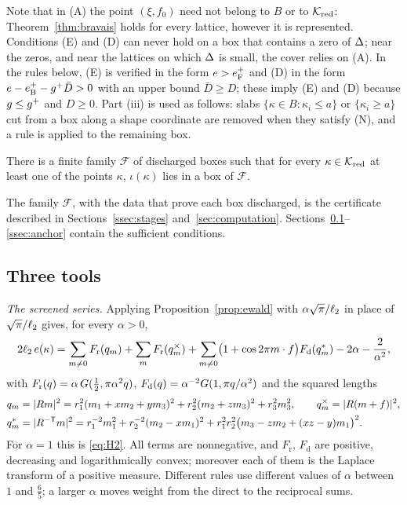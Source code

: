 Note that in (A) the point $(\xi,f_0)$ need not belong to $B$ or to $\mathcal K_{\mathrm{red}}$: Theorem~\ref{thm:bravais} holds for every
lattice, however it is represented. Conditions (E) and (D) can never hold on a box that contains a zero of $\Delta$; near the zeros,
and near the lattices on which $\Delta$ is small, the cover relies on (A). In the rules below, (E) is verified in the form
$e>e_{\mathrm F}^+$ and (D) in the form $e-e_{\mathrm B}^+-g^+\bar D>0$ with an upper bound $\bar D\ge D$; these imply (E) and (D) because
$g\le g^+$ and $D\ge0$. Part (iii) is used as follows: slabs $\{\kappa\in B:\kappa_i\le a\}$ or $\{\kappa_i\ge a\}$ cut from a box
along a shape coordinate are removed when they satisfy (N), and a rule is applied to the remaining box.

\begin{theorem}[Cover]\label{thm:cover}
There is a finite family $\mathcal F$ of discharged boxes such that for every $\kappa\in\mathcal K_{\mathrm{red}}$ at least one of the
points $\kappa$, $\iota(\kappa)$ lies in a box of $\mathcal F$.
\end{theorem}

The family $\mathcal F$, with the data that prove each box discharged, is the certificate described in
Sections~\ref{ssec:stages} and~\ref{sec:computation}. Sections~\ref{ssec:tools}--\ref{ssec:anchor} contain the sufficient conditions.

\subsection{Three tools}\label{ssec:tools}

\emph{The screened series.} Applying Proposition~\ref{prop:ewald} with $\alpha\sqrt\pi/\ell_2$ in place of $\sqrt\pi/\ell_2$ gives,
for every $\alpha>0$,
\begin{equation}\label{eq:screened}
  2\ell_2\,e(\kappa)=\sum_{m\ne0}F_{\mathrm r}(q_m)+\sum_{m}F_{\mathrm r}(q^\times_m)+\sum_{m\ne0}\bigl(1+\cos2\pi m\cdot f\bigr)F_{\mathrm d}(q^*_m)
     -2\alpha-\frac2{\alpha^2},
\end{equation}
with $F_{\mathrm r}(q)=\alpha\,G(\frac12,\pi\alpha^2q)$, $F_{\mathrm d}(q)=\alpha^{-2}G(1,\pi q/\alpha^2)$ and the squared lengths
\begin{align*}
  q_m&=|Rm|^2=r_1^2(m_1+xm_2+ym_3)^2+r_2^2(m_2+zm_3)^2+r_3^2m_3^2,\qquad q^\times_m=|R(m+f)|^2,\\
  q^*_m&=|R^{-\mathsf T}m|^2=r_1^{-2}m_1^2+r_2^{-2}(m_2-xm_1)^2+r_1^2r_2^2\bigl(m_3-zm_2+(xz-y)m_1\bigr)^2 .
\end{align*}
For $\alpha=1$ this is \eqref{eq:H2}. All terms are nonnegative, and $F_{\mathrm r}$, $F_{\mathrm d}$ are positive, decreasing and
logarithmically convex; moreover each of them is the Laplace transform of a positive measure. Different rules use different values of
$\alpha$ between $1$ and $\frac65$; a larger $\alpha$ moves weight from the direct to the reciprocal sums.


